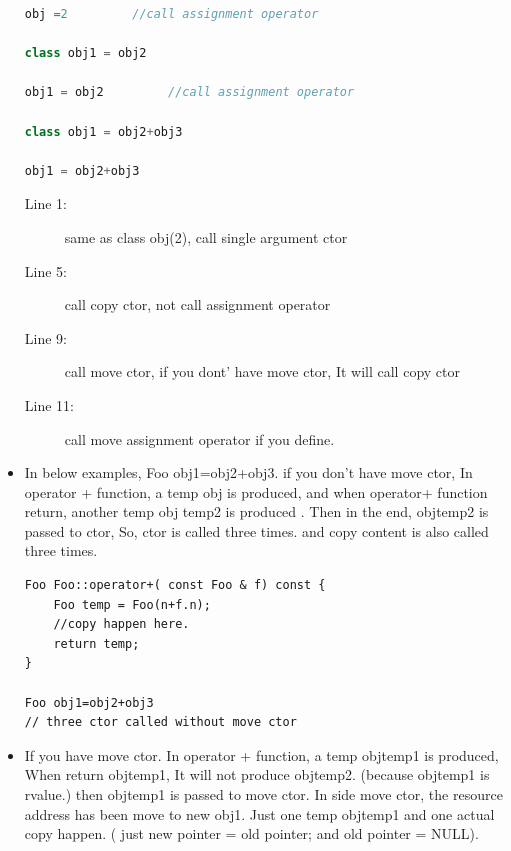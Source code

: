 \documentclass[a4paper,11pt,twoside]{book}
\begin{document}
\begin{itemize}
\begin{lstlisting}[frame=single, language=c++]
obj =2         //call assignment operator
	
class obj1 = obj2 
	
obj1 = obj2         //call assignment operator
	
class obj1 = obj2+obj3   
	
obj1 = obj2+obj3 
\end{lstlisting}
\begin{description}
	\item[Line 1:] same as class obj(2), call single argument ctor
	\item[Line 5:] call  copy ctor, not call assignment operator
	\item[Line 9:] call move ctor, if you dont' have move ctor, It will call copy ctor
	\item[Line 11:] call move assignment operator  if you define.
\end{description}
	
	\item In below examples, Foo obj1=obj2+obj3. if you don't have move ctor, In operator + function, a temp obj is produced,  and when operator+ function return, another temp obj temp2 is produced .  Then in the end, objtemp2 is passed to ctor,  So, ctor is called three times. and copy content is also called three times.
	
\begin{lstlisting}[numbers=none]
Foo Foo::operator+( const Foo & f) const {
	Foo temp = Foo(n+f.n);
	//copy happen here.
	return temp;
}
	
Foo obj1=obj2+obj3  
// three ctor called without move ctor
\end{lstlisting}
	
	\item If you have move ctor. In operator + function, a temp objtemp1 is produced,  When return objtemp1, It will not produce objtemp2. (because objtemp1 is rvalue.) then objtemp1 is passed to move ctor. In side move ctor, the resource address has been move to new obj1.  Just one temp objtemp1 and one actual copy happen. ( just new pointer = old pointer; and old pointer = NULL).
\end{itemize}
\end{document}
